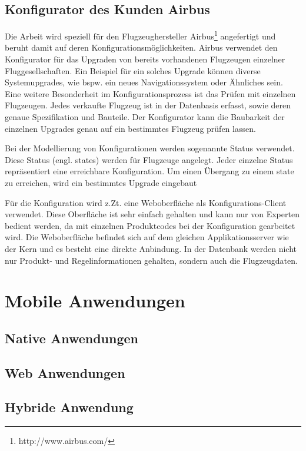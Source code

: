 \subsection{Konfigurator des Kunden Airbus} \label{airbusConfigurator}
Die Arbeit wird speziell für den Flugzeughersteller Airbus\footnote{http://www.airbus.com/} angefertigt und beruht damit auf deren Konfigurationsmöglichkeiten. Airbus verwendet den Konfigurator für das Upgraden von bereits vorhandenen Flugzeugen einzelner Fluggesellschaften. Ein Beispiel für ein solches Upgrade können diverse Systemupgrades, wie bspw. ein neues Navigationssystem oder Ähnliches sein. Eine weitere Besonderheit im Konfigurationsprozess ist das Prüfen mit einzelnen Flugzeugen. Jedes verkaufte Flugzeug ist in der Datenbasis erfasst, sowie deren genaue Spezifikation und Bauteile. Der Konfigurator kann die Baubarkeit der einzelnen Upgrades genau auf ein bestimmtes Flugzeug prüfen lassen. \par

 Bei der Modellierung von Konfigurationen werden sogenannte Status verwendet. Diese Status (engl. states) werden für Flugzeuge angelegt. Jeder einzelne Status repräsentiert eine erreichbare Konfiguration. Um einen Übergang zu einem state zu erreichen, wird ein bestimmtes Upgrade eingebaut  
 \par

Für die Konfiguration wird z.Zt. eine Weboberfläche als Konfigurations-Client verwendet. Diese Oberfläche ist sehr einfach gehalten und kann nur von Experten bedient werden, da mit einzelnen Produktcodes bei der Konfiguration gearbeitet wird. Die Weboberfläche befindet sich auf dem gleichen Applikationsserver wie der Kern und es besteht eine direkte Anbindung. In der Datenbank werden nicht nur Produkt- und Regelinformationen gehalten, sondern auch die Flugzeugdaten. 

  
\section{Mobile Anwendungen}

\subsection{Native Anwendungen}
\subsection{Web Anwendungen}
\subsection{Hybride Anwendung}


